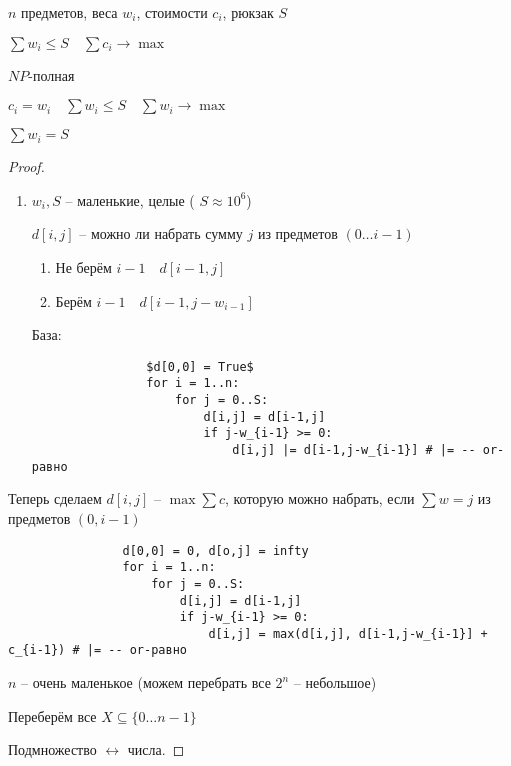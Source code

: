 \documentclass{book}
\theoremstyle{definition}
\begin{document}
\begin{problem}
    $n$ предметов, веса  $w_i$, стоимости  $c_i$, рюкзак  $S$

     $\sum w_i\leqslant S\quad \sum c_i \to \max$

     $NP$-полная

      $c_i=w_i\quad \sum w_i\leqslant S\quad \sum w_i\to \max$

      $\sum w_i =S$
\end{problem}
\begin{proof}
    \begin{enumerate}
        \item $w_i, S$ -- маленькие, целые ( $S \approx 10^6$)

            $d[i,j]$ -- можно ли набрать сумму  $j$ из предметов  $(0\ldots i-1)$

            \begin{enumerate}
                \item Не берём $i-1\quad d[i-1,j]$
                \item Берём  $i-1\quad d[i-1,j-w_{i-1}]$
            \end{enumerate}

            База:

            \begin{verbatim}
                $d[0,0] = True$
                for i = 1..n:
                    for j = 0..S:
                        d[i,j] = d[i-1,j]
                        if j-w_{i-1} >= 0:
                            d[i,j] |= d[i-1,j-w_{i-1}] # |= -- or-равно
            \end{verbatim}      
    \end{enumerate}

    Теперь сделаем $d[i,j]$ --  $\max\sum c$, которую можно набрать, если  $\sum w = j$ из предметов  $(0,i-1)$
            \begin{verbatim}
                d[0,0] = 0, d[o,j] = infty
                for i = 1..n:
                    for j = 0..S:
                        d[i,j] = d[i-1,j]
                        if j-w_{i-1} >= 0:
                            d[i,j] = max(d[i,j], d[i-1,j-w_{i-1}] + c_{i-1}) # |= -- or-равно
            \end{verbatim}      
        \item $n$ -- очень маленькое (можем перебрать все  $2^n$ -- небольшое)

            Переберём все  $X\subseteq \{0\ldots n-1\}$

            Подмножество $\leftrightarrow$  числа.


\end{proof}
\end{document}
